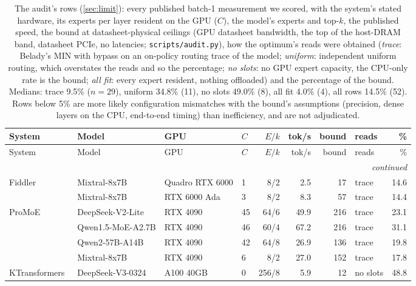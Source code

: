 \begin{footnotesize}
\setlength\tabcolsep{3pt}
\begin{longtable}{@{}p{}p{}p{}lrrrlr@{}}
\caption{The audit's rows (\cref{sec:limit}): every published batch-1 measurement we scored, with the system's stated hardware, its experts per layer resident on the GPU ($C$), the model's experts and top-$k$, the published speed, the bound at datasheet-physical ceilings (GPU datasheet bandwidth, the top of the host-DRAM band, datasheet PCIe, no latencies; \texttt{scripts/audit.py}), how the optimum's reads were obtained (\emph{trace}: Belady's MIN with bypass on an on-policy routing trace of the model; \emph{uniform}: independent uniform routing, which overstates the reads and so the percentage; \emph{no slots}: no GPU expert capacity, the CPU-only rate is the bound; \emph{all fit}: every expert resident, nothing offloaded) and the percentage of the bound. Medians: trace 9.5\% ($n{=}29$), uniform 34.8\% (11), no slots 49.0\% (8), all fit 4.0\% (4), all rows 14.5\% (52). Rows below 5\% are more likely configuration mismatches with the bound's assumptions (precision, dense layers on the CPU, end-to-end timing) than inefficiency, and are not adjudicated.}\label{tab:audit}\\
\toprule
System & Model & GPU & $C$ & $E/k$ & tok/s & bound & reads & \% \\\midrule
\endfirsthead
\toprule
System & Model & GPU & $C$ & $E/k$ & tok/s & bound & reads & \% \\\midrule
\endhead
\midrule\multicolumn{9}{r}{\emph{continued}}\\
\endfoot
\bottomrule
\endlastfoot
Fiddler~\cite{kamahori2024fiddler} & Mixtral-8x7B & Quadro RTX 6000 & 1 & 8/2 & 2.5 & 17 & trace & 14.6 \\
 & Mixtral-8x7B & RTX 6000 Ada & 3 & 8/2 & 8.3 & 57 & trace & 14.4 \\
ProMoE~\cite{song2024promoe} & DeepSeek-V2-Lite & RTX 4090 & 45 & 64/6 & 49.9 & 216 & trace & 23.1 \\
 & Qwen1.5-MoE-A2.7B & RTX 4090 & 46 & 60/4 & 67.2 & 216 & trace & 31.1 \\
 & Qwen2-57B-A14B & RTX 4090 & 42 & 64/8 & 26.9 & 136 & trace & 19.8 \\
 & Mixtral-8x7B & RTX 4090 & 6 & 8/2 & 27.0 & 152 & trace & 17.8 \\
KTransformers~\cite{ktransformers} & DeepSeek-V3-0324 & A100 40GB & 0 & 256/8 & 5.9 & 12 & no slots & 48.8 \\

\end{longtable}
\end{footnotesize}
